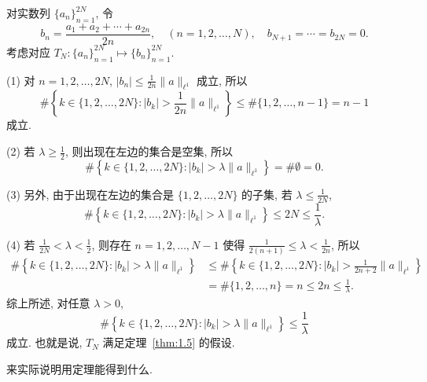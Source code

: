 \begin{example}\label{exa:1.9}
对实数列 $\{a_{n}\}_{n=1}^{2N}$, 令
\[
b_{n} = \frac{a_{1} + a_{2} + \cdots + a_{2n}}{2n}, \quad (n = 1, 2, \ldots, N), \quad b_{N+1} = \cdots = b_{2N} = 0.
\]
考虑对应 $T_{N}: \{a_{n}\}_{n=1}^{2N} \mapsto \{b_{n}\}_{n=1}^{2N}$.

(1) 对 $n = 1, 2, \ldots, 2N$, $|b_{n}| \leq \frac{1}{2n}\|a\|_{\ell^{1}}$ 成立, 所以
\[
\# \left\{k \in \{1, 2, \ldots, 2N\} : |b_{k}| > \frac{1}{2n}\|a\|_{\ell^{1}}\right\} \leq \# \{1, 2, \ldots, n-1\} = n-1
\]
成立.

(2) 若 $\lambda \geq \frac{1}{2}$, 则出现在左边的集合是空集, 所以
\[
\# \left\{k \in \{1, 2, \ldots, 2N\} : |b_{k}| > \lambda\|a\|_{\ell^{1}}\right\} = \#\emptyset = 0.
\]

(3) 另外, 由于出现在左边的集合是 $\{1, 2, \ldots, 2N\}$ 的子集, 若 $\lambda \leq \frac{1}{2N}$,
\[
\# \left\{k \in \{1, 2, \ldots, 2N\} : |b_{k}| > \lambda\|a\|_{\ell^{1}}\right\} \leq 2N \leq \frac{1}{\lambda}.
\]

(4) 若 $\frac{1}{2N} < \lambda < \frac{1}{2}$, 则存在 $n = 1, 2, \ldots, N-1$ 使得 $\frac{1}{2(n+1)} \leq \lambda < \frac{1}{2n}$, 所以
\begin{align*}
\# \left\{k \in \{1, 2, \ldots, 2N\} : |b_{k}| > \lambda\|a\|_{\ell^{1}}\right\} & \leq \# \left\{k \in \{1, 2, \ldots, 2N\} : |b_{k}| > \frac{1}{2n+2}\|a\|_{\ell^{1}}\right\} \\
& = \# \{1, 2, \ldots, n\} = n \leq 2n \leq \frac{1}{\lambda}.
\end{align*}
综上所述, 对任意 $\lambda > 0$,
\[
\# \left\{k \in \{1, 2, \ldots, 2N\} : |b_{k}| > \lambda\|a\|_{\ell^{1}}\right\} \leq \frac{1}{\lambda}
\]
成立. 也就是说, $T_{N}$ 满足定理~\ref{thm:1.5} 的假设.
\end{example}

来实际说明用定理能得到什么.

